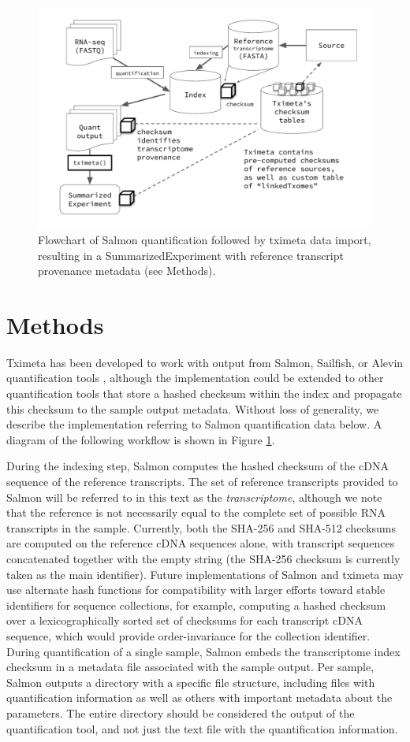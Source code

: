 \documentclass[12pt]{article} \usepackage[utf8]{inputenc}
\begin{document}
\begin{figure}
  \centering
  \includegraphics[width=.6\textwidth]{diagram.pdf}
  \caption{Flowchart of Salmon quantification followed by tximeta
    data import, resulting in a SummarizedExperiment with reference
    transcript provenance metadata (see Methods).}
  \label{fig:diagram}
\end{figure}

\section*{Methods}

Tximeta has been developed to work with output from Salmon, Sailfish,
or Alevin quantification tools \citep{sailfish,salmon,alevin},
although the implementation could be extended to other quantification
tools that store a hashed checksum within the index and propagate this
checksum to the sample output metadata. Without loss of generality, we
describe the implementation referring to Salmon quantification data
below. A diagram of the following workflow is shown in Figure
\ref{fig:diagram}. 

During the indexing step, Salmon computes the hashed checksum of the
cDNA sequence of the reference transcripts. The set of reference
transcripts provided to Salmon will be referred to in this text as the
\textit{transcriptome}, although we note that the reference is not
necessarily equal to the complete set of possible RNA transcripts in
the sample. Currently, both the SHA-256 and SHA-512 \citep{sha1}
checksums are computed on the reference cDNA sequences alone, with
transcript sequences concatenated together with the empty string (the
SHA-256 checksum is currently taken as the main identifier). Future
implementations of Salmon and tximeta may use alternate hash functions
for compatibility with larger efforts toward stable identifiers for
sequence collections, for example, computing a hashed checksum over a
lexicographically sorted set of checksums for each transcript cDNA
sequence, which would provide order-invariance for the collection
identifier. During quantification of a single sample, Salmon embeds
the transcriptome index checksum in a metadata file associated with
the sample output. Per sample, Salmon outputs a directory with a
specific file structure, including files with quantification
information as well as others with important metadata about the
parameters. The entire directory should be considered the output of
the quantification tool, and not just the text file with the
quantification information.
\end{document}
